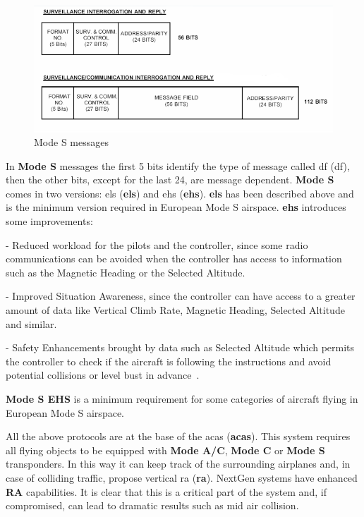 \documentclass[../main.tex]{subfiles}
\begin{document}
\begin{figure}[htp]
  \centering
  \includegraphics[scale=0.65]{images/modes.png}
  \caption{Mode S messages}
  \label{fig:modes}
\end{figure}

In \textbf{Mode S} messages the first 5 bits identify the type of message called \acrlong{df} (\acrshort{df}), then the other bits, except for the last 24, are message dependent. \textbf{Mode S} comes in two versions: \acrlong{els} (\textbf{\acrshort{els}}) and \acrlong{ehs} (\textbf{\acrshort{ehs}}). \textbf{\acrshort{els}} has been described above and is the minimum version required in European Mode S airspace. \textbf{\acrshort{ehs}} introduces some improvements:

- Reduced workload for the pilots and the controller, since some radio communications can be avoided when the controller has access to information such as the Magnetic Heading or the Selected Altitude.

- Improved Situation Awareness, since the controller can have access to a greater amount of data like Vertical Climb Rate, Magnetic Heading, Selected Altitude and similar.

- Safety Enhancements brought by data such as Selected Altitude which permits the controller to check if the aircraft is following the instructions and avoid potential collisions or level bust in advance~\cite{modesbook}.

\textbf{Mode S EHS} is a minimum requirement for some categories of aircraft flying in European Mode S airspace.

All the above protocols are at the base of the \acrlong{acas} (\textbf{\acrshort{acas}}). This system requires all flying objects to be equipped with \textbf{Mode A/C}, \textbf{Mode C} or \textbf{Mode S} transponders. In this way it can keep track of the surrounding airplanes and, in case of colliding traffic, propose vertical \acrlong{ra} (\textbf{\acrshort{ra}}). NextGen systems have enhanced \textbf{RA} capabilities. It is clear that this is a critical part of the system and, if compromised, can lead to dramatic results such as mid air collision.
\end{document}
